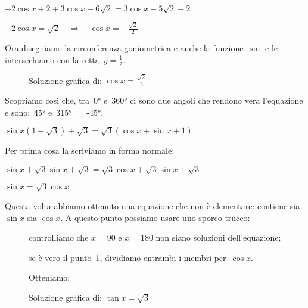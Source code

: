 \begin{exrig}
\begin{esempio}
  $- 2 \cos x +2 + 3 \cos x -6 \sqrt{2} = 3 \cos x -5 \sqrt{2} +2$
  
  $-2 \cos x  = \sqrt{2} \quad \Rightarrow \quad \cos x  = -\frac{\sqrt{2}}{2}$
  
  Ora disegniamo la circonferenza goniometrica e anche la funzione~$\sin$ 
  e le intersechiamo con la retta~$y=\frac{1}{2}$.
  
\begin{figure}[!h] 
 \vspace{-6pt}
  \begin{center}
\begin{inaccessibleblock}[Soluzione grafica dell'equazione: 
    $\cos x = \frac{\sqrt{2}}{2}$.]
    
    \caption{Soluzione grafica di: $\cos x = \frac{\sqrt{2}}{2}$}
    \label{fig:trigo_equazione02}
\end{inaccessibleblock}
  \end{center}
\vspace{-18pt}
\end{figure} 
  Scopriamo così che, tra~0° e~360° ci sono due angoli che rendono vera 
  l'equazione e sono:~45° e~315°~=~-45°. 
 \end{esempio}

 \begin{esempio}
  $\sin x (1 + \sqrt{3}) + \sqrt{3} = \sqrt{3}(\cos x + \sin x +1)$
  
  Per prima cosa la scriviamo in forma normale:
  
  $\sin x + \sqrt{3} \sin x + \sqrt{3} = 
   \sqrt{3} \cos x + \sqrt{3} \sin x + \sqrt{3}$
   
  $\sin x  = \sqrt{3} \cos x $
  
 Questa volta abbiamo ottenuto una equazione che non è elementare: 
  contiene sia $\sin x$ sia $\cos x$.
  A questo punto possiamo usare uno sporco trucco:
  
 \begin{figure}[!h]
 \begin{minipage}{.50\textwidth}
  \begin{center}
\begin{inaccessibleblock}[Soluzione grafica dell'equazione: 
    $\tan x = \sqrt{3}$.]
    
    \caption{Soluzione grafica di: $\tan x = \sqrt{3}$}
    \label{fig:trigo_equazione03}
\end{inaccessibleblock}
  \end{center}
 \end{minipage}
 \begin{minipage}{.48\textwidth}
  \begin{enumerate*}
   \item controlliamo che $x = 90$ e $x = 180$ non siano soluzioni 
    dell'equazione;
   \item se è vero il punto~1, dividiamo entrambi i membri per~$\cos x$.
  \end{enumerate*}
  Otteniamo:


\end{minipage}
\end{figure}
\end{esempio}
\end{exrig}
